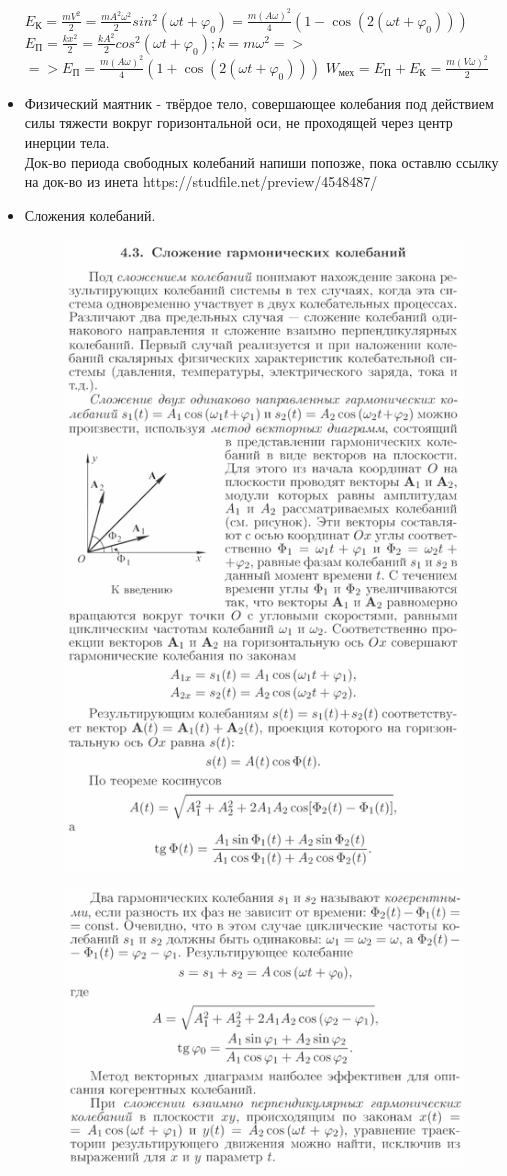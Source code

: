 \documentclass{article}
\begin{document}
\begin{flushleft}
\begin{itemize}
        $E_\text{К} = \frac{mV^2}{2} = \frac{mA^2\omega^2}{2}sin^2(\omega t + \varphi_0) = 
        \frac{m(A\omega)^2}{4}(1 - \cos(2(\omega t + \varphi_0)))$
        \\$E_\text{П} = \frac{kx^2}{2} = \frac{kA^2}{2}cos^2(\omega t + \varphi_0); k = m\omega^2 =>$ \\
        $=> E_\text{П} = \frac{m(A\omega)^2}{4}(1 + \cos(2(\omega t + \varphi_0)))$
        $W_\text{мех} = E_\text{П} + E_\text{К} = \frac{m(V\omega)^2}{2}$
        \item Физический маятник - твёрдое тело, совершающее колебания под действием силы тяжести вокруг горизонтальной оси, не проходящей через центр инерции тела.
        \\ Док-во периода свободных колебаний напиши попозже, пока оставлю ссылку на док-во из инета https://studfile.net/preview/4548487/
        \item Сложения колебаний.
        \begin{figure}[H]
            \centering
            \includegraphics[width=0.5\linewidth]{images/Screenshot_1.png}
        \end{figure}
        \begin{figure}[H]
            \centering
            \includegraphics[width=0.5\linewidth]{images/Screenshot_2.png}

\end{figure}
\end{itemize}
\end{flushleft}
\end{document}
